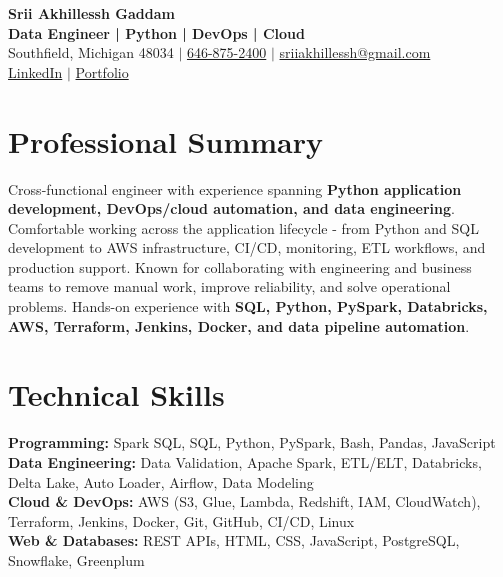 \documentclass[letterpaper,10pt]{article}
\begin{document}
\fontsize{9.35pt}{10.45pt}\selectfont

\begin{center}
    {\LARGE \textbf{Srii Akhillessh Gaddam}} \\[-1pt]
    \textbf{Data Engineer | Python | DevOps | Cloud} \\[2pt]
    Southfield, Michigan 48034 $|$
    \href{tel:6468752400}{646-875-2400} $|$
    \href{mailto:sriiakhillessh@gmail.com}{sriiakhillessh@gmail.com} \\[1pt]
    \href{https://www.linkedin.com/in/srii-akhiilessh-gaddam-b48668191/}{LinkedIn} $|$
    \href{https://sriiakhillesshg.github.io/portfolio/}{Portfolio}
\end{center}
\vspace{-8pt}

\section{Professional Summary}
\small{Cross-functional engineer with experience spanning \textbf{Python application development, DevOps/cloud automation, and data engineering}. Comfortable working across the application lifecycle - from Python and SQL development to AWS infrastructure, CI/CD, monitoring, ETL workflows, and production support. Known for collaborating with engineering and business teams to remove manual work, improve reliability, and solve operational problems. Hands-on experience with \textbf{SQL, Python, PySpark, Databricks, AWS, Terraform, Jenkins, Docker, and data pipeline automation}.}

\section{Technical Skills}
\small{
\textbf{Programming:} Spark SQL, SQL, Python, PySpark, Bash, Pandas, JavaScript \\
\textbf{Data Engineering:} Data Validation, Apache Spark, ETL/ELT, Databricks, Delta Lake, Auto Loader, Airflow, Data Modeling \\
\textbf{Cloud \& DevOps:} AWS (S3, Glue, Lambda, Redshift, IAM, CloudWatch), Terraform, Jenkins, Docker, Git, GitHub, CI/CD, Linux \\
\textbf{Web \& Databases:} REST APIs, HTML, CSS, JavaScript, PostgreSQL, Snowflake, Greenplum
}

\end{document}
